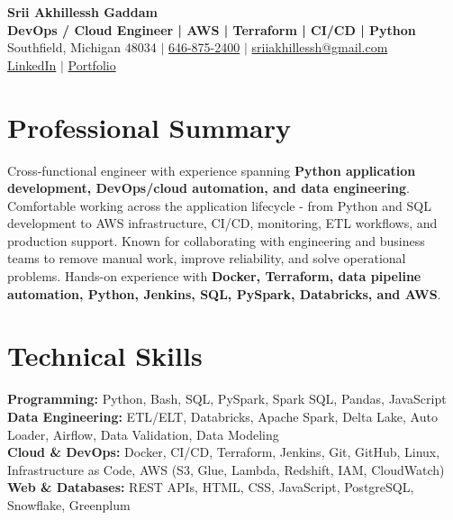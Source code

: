 \documentclass[letterpaper,10pt]{article}
\begin{document}
\fontsize{9.35pt}{10.45pt}\selectfont

\begin{center}
    {\LARGE \textbf{Srii Akhillessh Gaddam}} \\[-1pt]
    \textbf{DevOps / Cloud Engineer | AWS | Terraform | CI/CD | Python} \\[2pt]
    Southfield, Michigan 48034 $|$
    \href{tel:6468752400}{646-875-2400} $|$
    \href{mailto:sriiakhillessh@gmail.com}{sriiakhillessh@gmail.com} \\[1pt]
    \href{https://www.linkedin.com/in/srii-akhiilessh-gaddam-b48668191/}{LinkedIn} $|$
    \href{https://sriiakhillesshg.github.io/portfolio/}{Portfolio}
\end{center}
\vspace{-8pt}

\section{Professional Summary}
\small{Cross-functional engineer with experience spanning \textbf{Python application development, DevOps/cloud automation, and data engineering}. Comfortable working across the application lifecycle - from Python and SQL development to AWS infrastructure, CI/CD, monitoring, ETL workflows, and production support. Known for collaborating with engineering and business teams to remove manual work, improve reliability, and solve operational problems. Hands-on experience with \textbf{Docker, Terraform, data pipeline automation, Python, Jenkins, SQL, PySpark, Databricks, and AWS}.}

\section{Technical Skills}
\small{
\textbf{Programming:} Python, Bash, SQL, PySpark, Spark SQL, Pandas, JavaScript \\
\textbf{Data Engineering:} ETL/ELT, Databricks, Apache Spark, Delta Lake, Auto Loader, Airflow, Data Validation, Data Modeling \\
\textbf{Cloud \& DevOps:} Docker, CI/CD, Terraform, Jenkins, Git, GitHub, Linux, Infrastructure as Code, AWS (S3, Glue, Lambda, Redshift, IAM, CloudWatch) \\
\textbf{Web \& Databases:} REST APIs, HTML, CSS, JavaScript, PostgreSQL, Snowflake, Greenplum
}
\end{document}
